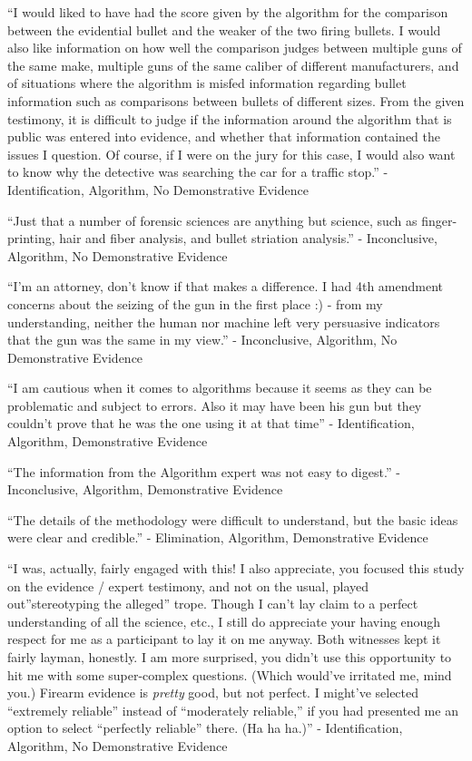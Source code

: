 \documentclass[print]{nuthesis}
\begin{document}
``I would liked to have had the score given by the algorithm for the comparison between the evidential bullet and the weaker of the two firing bullets. I would also like information on how well the comparison judges between multiple guns of the same make, multiple guns of the same caliber of different manufacturers, and of situations where the algorithm is misfed information regarding bullet information such as comparisons between bullets of different sizes. From the given testimony, it is difficult to judge if the information around the algorithm that is public was entered into evidence, and whether that information contained the issues I question. Of course, if I were on the jury for this case, I would also want to know why the detective was searching the car for a traffic stop.'' - Identification, Algorithm, No Demonstrative Evidence

``Just that a number of forensic sciences are anything but science, such as finger-printing, hair and fiber analysis, and bullet striation analysis.'' - Inconclusive, Algorithm, No Demonstrative Evidence

``I'm an attorney, don't know if that makes a difference. I had 4th amendment concerns about the seizing of the gun in the first place :) - from my understanding, neither the human nor machine left very persuasive indicators that the gun was the same in my view.'' - Inconclusive, Algorithm, No Demonstrative Evidence

``I am cautious when it comes to algorithms because it seems as they can be problematic and subject to errors. Also it may have been his gun but they couldn't prove that he was the one using it at that time'' - Identification, Algorithm, Demonstrative Evidence

``The information from the Algorithm expert was not easy to digest.'' - Inconclusive, Algorithm, Demonstrative Evidence

``The details of the methodology were difficult to understand, but the basic ideas were clear and credible.'' - Elimination, Algorithm, Demonstrative Evidence

``I was, actually, fairly engaged with this! I also appreciate, you focused this study on the evidence / expert testimony, and not on the usual, played out''stereotyping the alleged'' trope. Though I can't lay claim to a perfect understanding of all the science, etc., I still do appreciate your having enough respect for me as a participant to lay it on me anyway. Both witnesses kept it fairly layman, honestly. I am more surprised, you didn't use this opportunity to hit me with some super-complex questions. (Which would've irritated me, mind you.) Firearm evidence is \emph{pretty} good, but not perfect. I might've selected ``extremely reliable'' instead of ``moderately reliable,'' if you had presented me an option to select ``perfectly reliable'' there. (Ha ha ha.)'' - Identification, Algorithm, No Demonstrative Evidence
\end{document}
